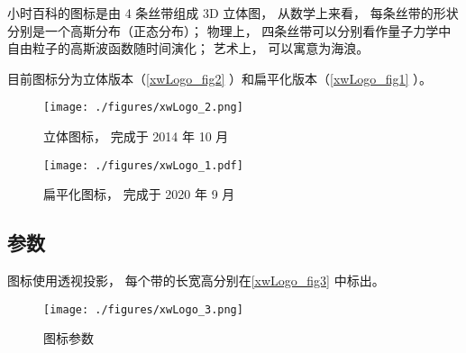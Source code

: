 
\begin{issues}
\issueTODO
\end{issues}

小时百科的图标是由 4 条丝带组成 3D 立体图， 从数学上来看， 每条丝带的形状分别是一个高斯分布（正态分布）； 物理上， 四条丝带可以分别看作量子力学中自由粒子的高斯波函数随时间演化； 艺术上， 可以寓意为海浪。

目前图标分为立体版本（\autoref{xwLogo_fig2} ）和扁平化版本（\autoref{xwLogo_fig1} ）。

\begin{figure}[ht]
\centering
\texttt{[image: ./figures/xwLogo\_2.png]}
\caption{立体图标， 完成于 2014 年 10 月} \label{xwLogo_fig2}
\end{figure}

\begin{figure}[ht]
\centering
\texttt{[image: ./figures/xwLogo\_1.pdf]}
\caption{扁平化图标， 完成于 2020 年 9 月} \label{xwLogo_fig1}
\end{figure}

\subsection{参数}
图标使用透视投影， 每个带的长宽高分别在\autoref{xwLogo_fig3} 中标出。
\begin{figure}[ht]
\centering
\texttt{[image: ./figures/xwLogo\_3.png]}
\caption{图标参数} \label{xwLogo_fig3}
\end{figure}
